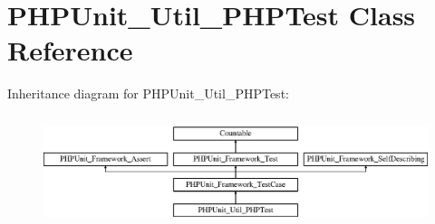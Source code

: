 \hypertarget{class_p_h_p_unit___util___p_h_p_test}{}\section{P\+H\+P\+Unit\+\_\+\+Util\+\_\+\+P\+H\+P\+Test Class Reference}
\label{class_p_h_p_unit___util___p_h_p_test}
Inheritance diagram for P\+H\+P\+Unit\+\_\+\+Util\+\_\+\+P\+H\+P\+Test\+:\begin{figure}[H]
\begin{center}
\leavevmode
\includegraphics[height=3.303835cm]{class_p_h_p_unit___util___p_h_p_test}
\end{center}
\end{figure}
